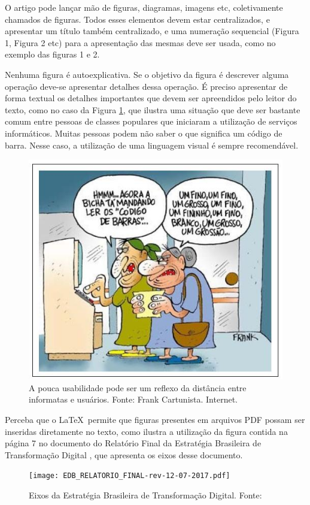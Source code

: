 \documentclass[12pt]{article}
\begin{document}
	O artigo pode lançar mão de figuras, diagramas, imagens etc, coletivamente chamados de figuras. Todos esses elementos devem estar centralizados, e apresentar um título também centralizado, e uma numeração sequencial (Figura 1, Figura 2 etc) para a apresentação das mesmas deve ser usada, como no exemplo das figuras 1 e 2.

	Nenhuma figura é autoexplicativa. Se o objetivo da figura é descrever alguma operação deve-se apresentar detalhes dessa operação.
	É preciso apresentar de forma textual os detalhes importantes que devem ser apreendidos pelo leitor do texto, como no caso da Figura \ref{fig:1}, que ilustra uma situação que deve ser bastante comum entre pessoas de classes populares que iniciaram a utilização de serviços informáticos. Muitas pessoas podem não saber o que significa um código de barra. Nesse caso, a utilização de uma linguagem visual é sempre recomendável.

	\begin{figure}[ht]
		\centering
		\includegraphics[width=.7\textwidth]{piada-codigodebarras.JPG}
		\caption{A pouca usabilidade pode ser um reflexo da distância entre informatas e usuários. Fonte: Frank Cartunista. Internet. }\label{fig:1}
	\end{figure}

	Perceba que o \LaTeX\ permite que figuras presentes em arquivos PDF possam ser inseridas diretamente no texto, como ilustra a utilização da figura contida na página 7 no documento do Relatório Final da Estratégia Brasileira de Transformação Digital \citep{gt_interministerial_port._n_842/2017_estrategia_2017}, que apresenta os eixos desse documento.

	\begin{figure}[ht]
		\centering
		\texttt{[image: EDB\_RELATORIO\_FINAL-rev-12-07-2017.pdf]}
		\caption{Eixos da Estratégia Brasileira de Transformação Digital.\label{EBTD} Fonte: \citep[p. 7]{gt_interministerial_port._n_842/2017_estrategia_2017}}
	\end{figure}
\end{document}
